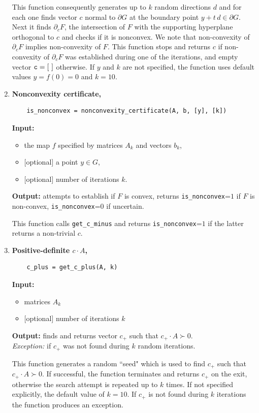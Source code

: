 \documentclass[a4paper]{article}
\theoremstyle{definition}
\begin{document}
\begin{enumerate}
	This function consequently generates up to $k$ random directions $d$ and for each one finds vector $c$ normal to $\partial G$ at the boundary point $y+t\, d\in \partial G$.  Next it finds $\partial_c F$, the intersection of $F$ with the supporting hyperplane orthogonal to $c$ and checks if it is nonconvex.  We note that non-convexity of $\partial_c F$ implies non-convexity of $F$. This function stops and returns $c$ if non-convexity of $\partial_c F$ was established during one of the iterations, and empty vector ${\tt c=[\ ]}$ otherwise. 
If $y$ and $k$ are not specified, the function uses default values $y=f(0)=0$ and $k=10$.


\item {\bf Nonconvexity certificate,\hskip 6pt} 
	\begin{verbatim}
	is_nonconvex = nonconvexity_certificate(A, b, [y], [k])
	\end{verbatim}
{\bf Input:}
\begin{itemize}
	\item the map $f$ specified by matrices $A_k$ and vectors $b_k$,
	\item  $[$optional$]$ a point $y\in G$,
	\item $[$optional$]$ number of iterations $k$.
\end{itemize}
{\bf Output:} attempts to establish if $F$ is convex, returns {\tt is\_nonconvex}=$1$ if $F$ is non-convex,  {\tt is\_nonconvex}=$0$ if uncertain.

	
	This function calls {\tt get\_c\_minus} and returns  {\tt is\_nonconvex}=$1$ if the latter returns a non-trivial $c$. 


\item {\bf Positive-definite $c\cdot A$,\hskip 6pt}
\begin{verbatim}
	c_plus = get_c_plus(A, k)
\end{verbatim}

{\bf Input:}
\begin{itemize}
	\item matrices $A_k$
	\item $[$optional$]$ number of iterations $k$
\end{itemize}
{\bf Output:} finds and returns vector $c_+$ such that $c_+\cdot A\succ 0$.\\
{\it Exception:} if $c_+$  was not found during $k$ random iterations.

	
	This function generates a random ``seed" which is used to find $c_+$ such that $c_+\cdot A\succ 0$. If successful, the function terminates and returns $c_+$ on the exit, otherwise the search attempt is repeated up to $k$ times. If not specified explicitly, the default value of $k=10$. If $c_+$ is not found during $k$ iterations the function produces an exception. 
	

\end{enumerate}
\end{document}
